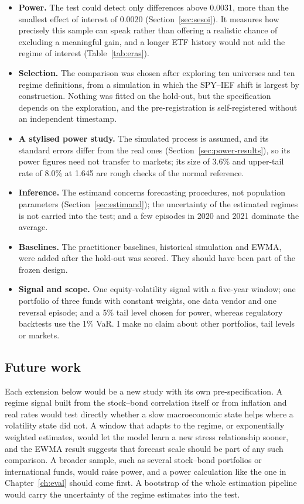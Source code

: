\begin{itemize}
\item \textbf{Power.} The test could detect only differences above 0.0031, more than the smallest effect of interest of 0.0020 (Section~\ref{sec:sesoi}). It measures how precisely this sample can speak rather than offering a realistic chance of excluding a meaningful gain, and a longer ETF history would not add the regime of interest (Table~\ref{tab:eras}).
\item \textbf{Selection.} The comparison was chosen after exploring ten universes and ten regime definitions, from a simulation in which the SPY--IEF shift is largest by construction. Nothing was fitted on the hold-out, but the specification depends on the exploration, and the pre-registration is self-registered without an independent timestamp.
\item \textbf{A stylised power study.} The simulated process is assumed, and its standard errors differ from the real ones (Section~\ref{sec:power-results}), so its power figures need not transfer to markets; its size of 3.6\% and upper-tail rate of 8.0\% at 1.645 are rough checks of the normal reference.
\item \textbf{Inference.} The estimand concerns forecasting procedures, not population parameters (Section~\ref{sec:estimand}); the uncertainty of the estimated regimes is not carried into the test; and a few episodes in 2020 and 2021 dominate the average.
\item \textbf{Baselines.} The practitioner baselines, historical simulation and EWMA, were added after the hold-out was scored. They should have been part of the frozen design.
\item \textbf{Signal and scope.} One equity-volatility signal with a five-year window; one portfolio of three funds with constant weights, one data vendor and one reversal episode; and a 5\% tail level chosen for power, whereas regulatory backtests use the 1\% VaR. I make no claim about other portfolios, tail levels or markets.
\end{itemize}

\subsection{Future work}\label{sec:disc-future}

Each extension below would be a new study with its own pre-specification. A regime signal built from the stock--bond correlation itself or from inflation and real rates would test directly whether a slow macroeconomic state helps where a volatility state did not. A window that adapts to the regime, or exponentially weighted estimates, would let the model learn a new stress relationship sooner, and the EWMA result suggests that forecast scale should be part of any such comparison. A broader sample, such as several stock--bond portfolios or international funds, would raise power, and a power calculation like the one in Chapter~\ref{ch:eval} should come first. A bootstrap of the whole estimation pipeline would carry the uncertainty of the regime estimates into the test.
